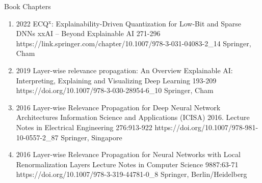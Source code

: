 \headedsubsection
{Book Chapters}{}
{
    \begin{enumerate}


        \item {}
                            {2022}
                            {ECQ$^{\textrm{x}}$: Explainability-Driven Quantization for Low-Bit and Sparse DNNs}
                            {xxAI -- Beyond Explainable AI}
                            {271-296}
                            {https://link.springer.com/chapter/10.1007/978-3-031-04083-2_14}
                            {Springer, Cham}

        \item {}
                            {2019}
                            {Layer-wise relevance propagation: An Overview}
                            {Explainable AI: Interpreting, Explaining and Visualizing Deep Learning}
                            {193-209}
                            {https://doi.org/10.1007/978-3-030-28954-6_10}
                            {Springer, Cham}

        \item {}
                            {2016}
                            {Layer-wise Relevance Propagation for Deep Neural Network Architectures}
                            {Information Science and Applications (ICISA) 2016. Lecture Notes in Electrical Engineering}
                            {276:913-922}
                            {https://doi.org/10.1007/978-981-10-0557-2_87}
                            {Springer, Singapore}

        \item {}
                            {2016}
                            {Layer-wise Relevance Propagation for Neural Networks with Local Renormalization Layers}
                            {Lecture Notes in Computer Science}
                            {9887:63-71}
                            {https://doi.org/10.1007/978-3-319-44781-0_8}
                            {Springer, Berlin/Heidelberg}
    \end{enumerate}

}
